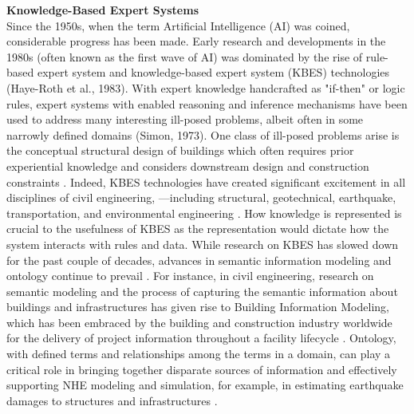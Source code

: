 \noindent\textbf{Knowledge-Based Expert Systems} \\Since the 1950s, when the term Artificial Intelligence (AI) was coined, considerable progress has been made. Early research and developments in the 1980s (often known as the first wave of AI) was dominated by the rise of rule-based expert system and knowledge-based expert system (KBES) technologies (Haye-Roth et al., 1983). With expert knowledge handcrafted as "if-then" or logic rules, expert systems with enabled reasoning and inference mechanisms have been used to address many interesting ill-posed problems, albeit often in some narrowly defined domains (Simon, 1973). One class of ill-posed problems arise is the conceptual structural design of buildings which often requires prior experiential knowledge and considers downstream design and construction constraints \citep{sriram1985knowledgebased,kumar1997cadrem, Jain et al., 1991a, 1991b}. Indeed, KBES technologies have created significant excitement in all disciplines of civil engineering, —including structural, geotechnical, earthquake, transportation, and environmental engineering \citep{kostem1986expert,palmer1987special,dym1991knowledgebased,cohn1992knowledgebased,sriram1997intelligent}. How knowledge is represented is crucial to the usefulness of KBES as the representation would dictate how the system interacts with rules and data. While research on KBES has slowed down for the past couple of decades, advances in semantic information modeling and ontology continue to prevail \citep{stevens2000ontologybased,noy2009bioportal}. For instance, in civil engineering, research on semantic modeling and the process of capturing the semantic information about buildings and infrastructures has given rise to Building Information Modeling, which has been embraced by the building and construction industry worldwide for the delivery of project information throughout a facility lifecycle \citep{sacks2018bim}. Ontology, with defined terms and relationships among the terms in a domain, can play a critical role in bringing together disparate sources of information and effectively supporting NHE modeling and simulation, for example, in estimating earthquake damages to structures and infrastructures \citep{yu2016image}.
\newline
 
